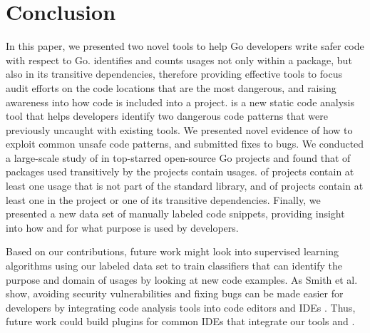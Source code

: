\section{Conclusion}
\label{sec:concl}

In this paper, we presented two novel tools to help Go developers write safer code with respect to \unsafe{} Go.
\toolUsage{} identifies and counts \unsafe{} usages not only within a package, but also in its transitive dependencies, therefore providing effective tools to focus audit efforts on the code locations that are the most dangerous, and raising awareness into how \unsafe{} code is included into a project.
\toolSA{} is a new static code analysis tool that helps developers identify two dangerous code patterns that were previously uncaught with existing tools.
We presented novel evidence of how to exploit common unsafe code patterns, and submitted fixes to \numberBugsFixed{} bugs.
We conducted a large-scale study of \packagesAnalyzed{} in \projsAnalyzed{} top-starred open-source Go projects and found that \percentagePackagesWithUnsafe{} of packages used transitively by the projects contain \unsafe{} usages. 
\percentageProjectsWithUnsafe{} of projects contain at least one usage that is not part of the standard library, and \percentageProjectsAndDependenciesUnsafe{} of projects contain at least one \unsafe{} in the project or one of its transitive dependencies.
Finally, we presented a new data set of manually labeled code snippets, providing insight into how and for what purpose \unsafe{} is used by developers.

Based on our contributions, future work might look into supervised learning algorithms using our labeled data set to train classifiers that can identify the purpose and domain of \unsafe{} usages by looking at new code examples.
As Smith et al. show, avoiding security vulnerabilities and fixing bugs can be made easier for developers by integrating code analysis tools into code editors and IDEs \cite{smith2020}.
Thus, future work could build plugins for common IDEs that integrate our tools \toolUsage{} and \toolSA{}.
